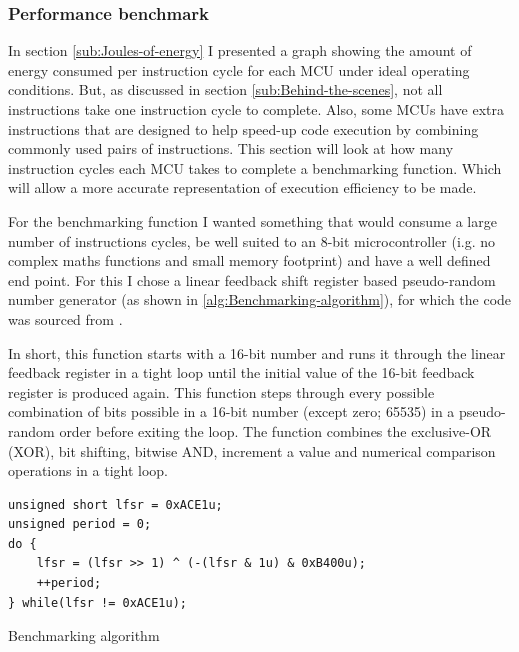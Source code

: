 \subsubsection{Performance benchmark}

In section \ref{sub:Joules-of-energy} I presented a graph showing
the amount of energy consumed per instruction cycle for each MCU under
ideal operating conditions. But, as discussed in section \ref{sub:Behind-the-scenes},
not all instructions take one instruction cycle to complete. Also,
some MCUs have extra instructions that are designed to help speed-up
code execution by combining commonly used pairs of instructions. This
section will look at how many instruction cycles each MCU takes to
complete a benchmarking function. Which will allow a more accurate
representation of execution efficiency to be made.

For the benchmarking function I wanted something that would consume
a large number of instructions cycles, be well suited to an 8-bit
microcontroller (i.g. no complex maths functions and small memory
footprint) and have a well defined end point. For this I chose a linear
feedback shift register based pseudo-random number generator (as shown
in \ref{alg:Benchmarking-algorithm}), for which the code was sourced
from \cite{LinearFeedbackRegister}.

In short, this function starts with a 16-bit number and runs it through
the linear feedback register in a tight loop until the initial value
of the 16-bit feedback register is produced again. This function steps
through every possible combination of bits possible in a 16-bit number
(except zero; 65535) in a pseudo-random order before exiting the loop.
The function combines the exclusive-OR (XOR), bit shifting, bitwise
AND, increment a value and numerical comparison operations in a tight
loop.

\begin{algorithm}
\begin{lstlisting}
unsigned short lfsr = 0xACE1u;
unsigned period = 0;
do {
	lfsr = (lfsr >> 1) ^ (-(lfsr & 1u) & 0xB400u);
	++period;
} while(lfsr != 0xACE1u);
\end{lstlisting}
\caption{\label{alg:Benchmarking-algorithm}Benchmarking algorithm}
\end{algorithm}


